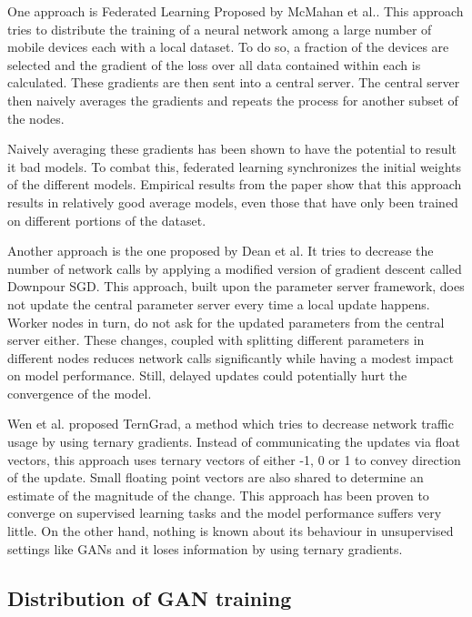 \documentclass[11pt]{article}       %
\begin{document}
One approach is Federated Learning Proposed by McMahan et al.\cite{BrendanMcMahan2017}. This approach tries to distribute the training of a neural network among a large number of mobile devices each with a local dataset. To do so, a fraction of the devices are selected and the gradient of the loss over all data contained within each is calculated. These gradients are then sent into a central server. The central server then naively averages the gradients and repeats the process for another subset of the nodes.

Naively averaging these gradients has been shown to have the potential to result it bad models.\cite{goodfellow2014qualitatively} To combat this, federated learning synchronizes the initial weights of the different models. Empirical results from the paper show that this approach results in relatively good average models, even those that have only been trained on different portions of the dataset.

Another approach is the one proposed by Dean et al.\cite{dean2012large} It tries to decrease the number of network calls by applying a modified version of gradient descent called Downpour SGD. This approach, built upon the parameter server framework, does not update the central parameter server every time a local update happens. Worker nodes in turn, do not ask for the updated parameters from the central server either. These changes, coupled with splitting different parameters in different nodes reduces network calls significantly while having a modest impact on model performance. Still, delayed updates could potentially hurt the convergence of the model.

Wen et al. proposed TernGrad\cite{wen2017terngrad}, a method which tries to decrease network traffic usage by using ternary gradients. Instead of communicating the updates via float vectors, this approach uses ternary vectors of either -1, 0 or 1 to convey direction of the update. Small floating point vectors are also shared to determine an estimate of the magnitude of the change. This approach has been proven to converge on supervised learning tasks and the model performance suffers very little. On the other hand, nothing is known about its behaviour in unsupervised settings like GANs and it loses information by using ternary gradients.

\subsection{Distribution of GAN training}
\end{document}
